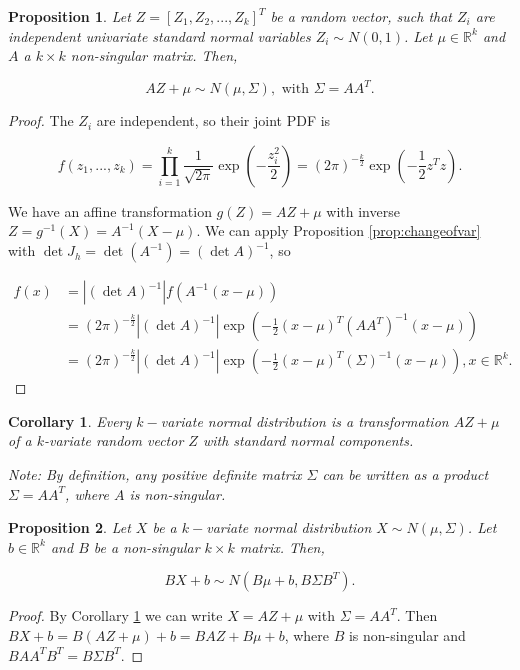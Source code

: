 \documentclass{book}
\theoremstyle{plain}%
\newtheorem{corollary}{Corollary}[section]
\newtheorem{proposition}{Proposition}[section]
\theoremstyle{definition}
\begin{document}
\begin{proposition}
Let $Z = [Z_1, Z_2,...,Z_k]^T$ be a random vector, such that $Z_i$ are independent univariate standard normal variables $Z_i \sim N(0,1)$. Let $\mu \in \mathbb{R}^k$ and $A$ a $k \times k$ non-singular matrix. Then,

$$AZ + \mu \sim N(\mu, \Sigma), \text{ with } \Sigma = AA^T.$$
\end{proposition}

\begin{proof}
The $Z_i$ are independent, so their joint PDF is

$$f(z_1,...,z_k) = \prod_{i=1}^k \frac{1}{\sqrt{2\pi}}\exp(-\frac{z_i^2}{2}) = (2\pi)^{-\frac{k}{2}}\exp(-\frac{1}{2}z^Tz).$$

We have an affine transformation $g(Z) = AZ + \mu$ with inverse $Z = g^{-1}(X) = A^{-1}(X - \mu)$. We can apply Proposition \ref{prop:changeofvar} with $\det J_h = \det (A^{-1}) = (\det A)^{-1}$, so

\begin{align*}
f(x) &= |(\det A)^{-1}|f(A^{-1}(x - \mu))\\
&= (2\pi)^{-\frac{k}{2}}|(\det A)^{-1}|\exp\left(-\frac{1}{2}(x - \mu)^T(AA^T)^{-1}(x - \mu)\right)\\
&= (2\pi)^{-\frac{k}{2}}|(\det A)^{-1}|\exp\left(-\frac{1}{2}(x - \mu)^T(\Sigma)^{-1}(x - \mu)\right), x \in \mathbb{R}^k.
\end{align*}

\end{proof}

\begin{corollary}
Every $k-$variate normal distribution is a transformation $AZ + \mu$ of a $k$-variate random vector $Z$ with standard normal components.

Note: By definition, any positive definite matrix $\Sigma$ can be written as a product $\Sigma = AA^T$, where $A$ is non-singular.\label{cor:mvn}
\end{corollary}

\begin{proposition}
Let $X$ be a $k-$variate normal distribution $X \sim N(\mu, \Sigma)$. Let $b \in \mathbb{R}^k$ and $B$ be a non-singular $k \times k$ matrix. Then,

$$BX + b \sim N(B\mu + b, B\Sigma B^T).$$
\end{proposition}

\begin{proof}
By Corollary \ref{cor:mvn} we can write $X = AZ + \mu$ with $\Sigma = AA^T$. Then $BX + b = B(AZ + \mu) + b = BAZ + B\mu + b$, where $B$ is non-singular and $BAA^TB^T = B\Sigma B^T$.
\end{proof}
\end{document}
